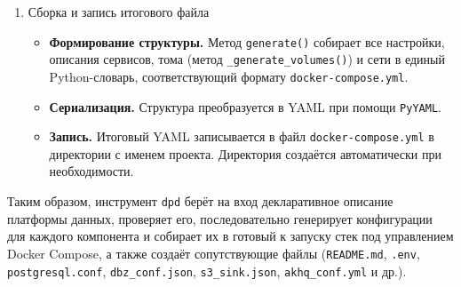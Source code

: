\begin{enumerate}[1.]
      \item Сборка и запись итогового файла
            \begin{itemize}
                  \item \textbf{Формирование структуры.} Метод \texttt{generate()} собирает все настройки, описания сервисов, тома (метод \texttt{\_generate\_volumes()}) и сети в единый Python-словарь, соответствующий формату \texttt{docker-compose.yml}.
                  \item \textbf{Сериализация.} Структура преобразуется в YAML при помощи \texttt{PyYAML}.
                  \item \textbf{Запись.} Итоговый YAML записывается в файл \texttt{docker-compose.yml} в директории с именем проекта. Директория создаётся автоматически при необходимости.
            \end{itemize}
\end{enumerate}

Таким образом, инструмент \texttt{dpd} берёт на вход декларативное описание платформы данных, проверяет его, последовательно генерирует конфигурации для каждого компонента и собирает их в готовый к запуску стек под управлением Docker Compose, а также создаёт сопутствующие файлы (\texttt{README.md}, \texttt{.env}, \texttt{postgresql.conf}, \texttt{dbz\_conf.json}, \texttt{s3\_sink.json}, \texttt{akhq\_conf.yml} и др.).




%
